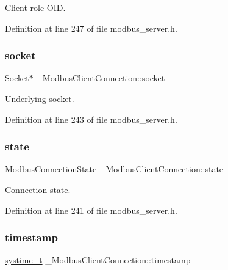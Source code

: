 Client role O\+ID. 



Definition at line 247 of file modbus\+\_\+server.\+h.

\mbox{\label{struct__ModbusClientConnection_a4ae661cf03ad2a92cb877128fe48d925}} 
\subsubsection{\texorpdfstring{socket}{socket}}
{\footnotesize\ttfamily \hyperlink{socket_8h_aa85acfb0fa336ef495e6ba87fb88fc48}{Socket}$\ast$ \+\_\+\+Modbus\+Client\+Connection\+::socket}



Underlying socket. 



Definition at line 243 of file modbus\+\_\+server.\+h.

\mbox{\label{struct__ModbusClientConnection_aaee0172f0c630ce661ebf5c3d2633a91}} 
\subsubsection{\texorpdfstring{state}{state}}
{\footnotesize\ttfamily \hyperlink{modbus__server_8h_a833fbe8b8a0937e5fd644bcad5b11fbc}{Modbus\+Connection\+State} \+\_\+\+Modbus\+Client\+Connection\+::state}



Connection state. 



Definition at line 241 of file modbus\+\_\+server.\+h.

\mbox{\label{struct__ModbusClientConnection_a4a7311c0a99826096d7c8348b4193f98}} 
\subsubsection{\texorpdfstring{timestamp}{timestamp}}
{\footnotesize\ttfamily \hyperlink{compiler__port_8h_ae3e32a98d431a02106616da3071832dd}{systime\+\_\+t} \+\_\+\+Modbus\+Client\+Connection\+::timestamp}



